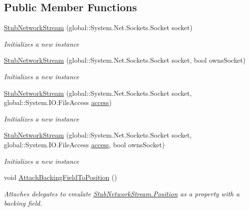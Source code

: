 \subsection*{Public Member Functions}
\begin{DoxyCompactItemize}
\item 
\hyperlink{class_system_1_1_net_1_1_sockets_1_1_fakes_1_1_stub_network_stream_aa5ba190bee4b896cb428e9637106b5f0}{Stub\-Network\-Stream} (global\-::\-System.\-Net.\-Sockets.\-Socket socket)
\begin{DoxyCompactList}\small\item\em Initializes a new instance\end{DoxyCompactList}\item 
\hyperlink{class_system_1_1_net_1_1_sockets_1_1_fakes_1_1_stub_network_stream_a5442ff3de24be723b06afc7057804fc2}{Stub\-Network\-Stream} (global\-::\-System.\-Net.\-Sockets.\-Socket socket, bool owns\-Socket)
\begin{DoxyCompactList}\small\item\em Initializes a new instance\end{DoxyCompactList}\item 
\hyperlink{class_system_1_1_net_1_1_sockets_1_1_fakes_1_1_stub_network_stream_a96ef92ef8fb69327fd4c050200a2f0c9}{Stub\-Network\-Stream} (global\-::\-System.\-Net.\-Sockets.\-Socket socket, global\-::\-System.\-I\-O.\-File\-Access \hyperlink{jquery-1_810_82-vsdoc_8js_a130ad18d21e14ee566dbf4eb185f2bda}{access})
\begin{DoxyCompactList}\small\item\em Initializes a new instance\end{DoxyCompactList}\item 
\hyperlink{class_system_1_1_net_1_1_sockets_1_1_fakes_1_1_stub_network_stream_ad2577f09662331150d232f5cbef23f2d}{Stub\-Network\-Stream} (global\-::\-System.\-Net.\-Sockets.\-Socket socket, global\-::\-System.\-I\-O.\-File\-Access \hyperlink{jquery-1_810_82-vsdoc_8js_a130ad18d21e14ee566dbf4eb185f2bda}{access}, bool owns\-Socket)
\begin{DoxyCompactList}\small\item\em Initializes a new instance\end{DoxyCompactList}\item 
void \hyperlink{class_system_1_1_net_1_1_sockets_1_1_fakes_1_1_stub_network_stream_a7f9606306cd07593c0fea1bb2c51970e}{Attach\-Backing\-Field\-To\-Position} ()
\begin{DoxyCompactList}\small\item\em Attaches delegates to emulate \hyperlink{class_system_1_1_net_1_1_sockets_1_1_fakes_1_1_stub_network_stream_aba1260225efb4ae8dacd92df5cc51a39}{Stub\-Network\-Stream.\-Position} as a property with a backing field.\end{DoxyCompactList}\item 

\end{DoxyCompactItemize}

